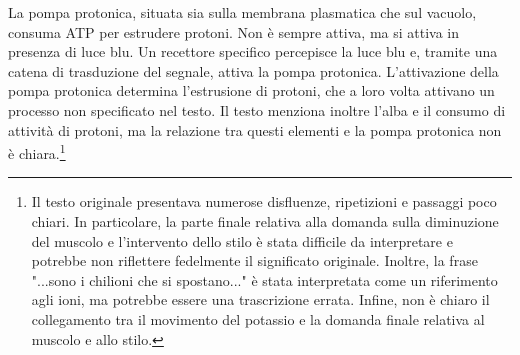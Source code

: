 \documentclass[11pt, a4paper]{article}
\begin{document}
\begin{spacing}{1.15}
La pompa protonica, situata sia sulla membrana plasmatica che sul vacuolo, consuma ATP per estrudere protoni. Non è sempre attiva, ma si attiva in presenza di luce blu. Un recettore specifico percepisce la luce blu e, tramite una catena di trasduzione del segnale, attiva la pompa protonica. L'attivazione della pompa protonica determina l'estrusione di protoni, che a loro volta attivano un processo non specificato nel testo. Il testo menziona inoltre l'alba e il consumo di attività di protoni, ma la relazione tra questi elementi e la pompa protonica non è chiara.\footnote{Il testo originale presentava numerose disfluenze, ripetizioni e passaggi poco chiari. In particolare, la parte finale relativa alla domanda sulla diminuzione del muscolo e l'intervento dello stilo è stata difficile da interpretare e potrebbe non riflettere fedelmente il significato originale. Inoltre, la frase "...sono i chilioni che si spostano..." è stata interpretata come un riferimento agli ioni, ma potrebbe essere una trascrizione errata. Infine, non è chiaro il collegamento tra il movimento del potassio e la domanda finale relativa al muscolo e allo stilo.}

\end{spacing}
\end{document}
